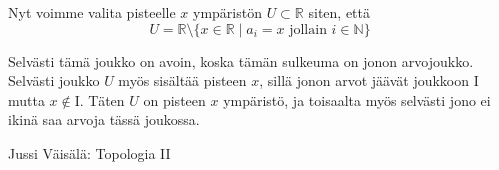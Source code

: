 \documentclass[12pt,a4paper,leqno]{report}
\newcommand{\R}{\mathbb{R}}
\newcommand{\N}{\mathbb{N}}
\newcommand{\I}{\mathrm{I}}
\theoremstyle{plain}
\theoremstyle{definition}
\theoremstyle{remark}
\begin{document}
Nyt voimme valita pisteelle $x$ ympäristön $U \subset \R$ siten, että
\begin{equation}
U = \R \setminus \{x \in \R \mid a_i = x \text{ jollain } i \in \N \}
\end{equation}

Selvästi tämä joukko on avoin, koska tämän sulkeuma on jonon arvojoukko. Selvästi joukko $U$ myös sisältää pisteen $x$, sillä jonon arvot jäävät joukkoon $\I$ mutta $x \not\in \I$. Täten $U$ on pisteen $x$ ympäristö, ja toisaalta myös selvästi jono ei ikinä saa arvoja tässä joukossa. 

\begin{thebibliography}{9}

Jussi Väisälä: Topologia II
\end{thebibliography}
\end{document}

